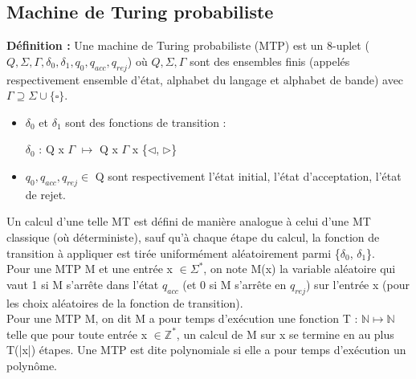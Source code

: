 \documentclass[12pt,a4paper]{article}
\begin{document}
\subsection{Machine de Turing probabiliste}
\textbf{Définition :} Une machine de Turing probabiliste (MTP) est un 8-uplet ($Q, \Sigma, \Gamma, \delta_0, \delta_1, q_0, q_{acc}, q_{rej}$) où $Q, \Sigma, \Gamma$ sont des ensembles finis (appelés respectivement ensemble d'état, alphabet du langage et alphabet de bande) avec $\Gamma \supseteq \Sigma \cup \{\square\}$.
\begin{itemize}
	\item $\delta_0$ et $\delta_1$ sont des fonctions de transition :
	\begin{center}
		$\delta_0$ : Q x $\Gamma$ $\longmapsto$ Q x $\Gamma$ x \{$\triangleleft$, $\triangleright$\}
	\end{center}
	\item $q_0, q_{acc}, q_{rej} \in$ Q sont respectivement l'état initial, l'état d'acceptation, l'état de rejet.
\end{itemize}
Un calcul d'une telle MT est défini de manière analogue à celui d'une MT classique (où déterministe), sauf qu'à chaque étape du calcul, la fonction de transition à appliquer est tirée uniformément aléatoirement parmi \{$\delta_0$, $\delta_1$\}.\\
Pour une MTP M et une entrée x $\in \Sigma^*$, on note M(x) la variable aléatoire qui vaut 1 si M s'arrête dans l'état $q_{acc}$ (et 0 si M s'arrête en $q_{rej}$) sur l'entrée x (pour les choix aléatoires de la fonction de transition).\\
Pour une MTP M, on dit M a pour temps d'exécution une fonction T : $\mathbb{N} \longmapsto \mathbb{N}$ telle que pour toute entrée x $\in \mathbb{Z}^*$, un calcul de M sur x se termine en au plus T(|x|) étapes. Une MTP est dite polynomiale si elle a pour temps d'exécution un polynôme.
\end{document}
